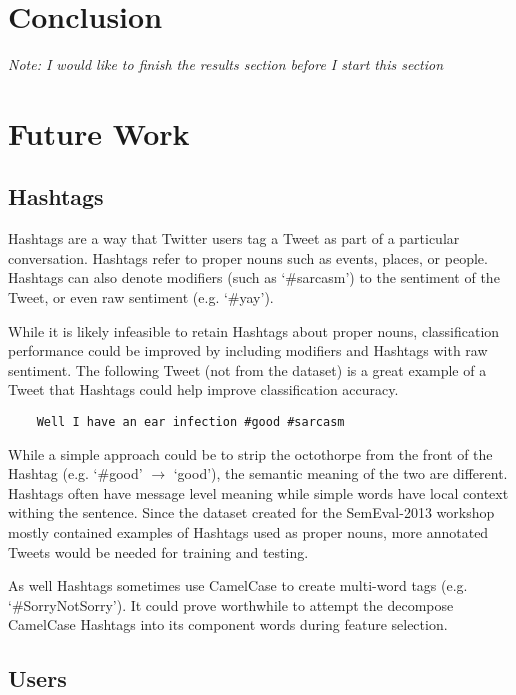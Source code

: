 \documentclass[final,3p,12pt]{elsarticle}
\begin{document}
\section{Conclusion}

\textit{Note: I would like to finish the results section before I start this section }


\section{Future Work}

\subsection{Hashtags}

Hashtags are a way that Twitter users tag a Tweet as part of a particular
conversation. Hashtags refer to proper nouns such as events, places, or people.
Hashtags can also denote modifiers (such as `\#sarcasm') to the sentiment of the
Tweet, or even raw sentiment (e.g. `\#yay').

While it is likely infeasible to retain Hashtags about proper nouns,
classification performance could be improved by including modifiers and
Hashtags with raw sentiment. The following Tweet (not from the dataset) is a
great example of a Tweet that Hashtags could help improve classification
accuracy.

\begin{verbatim}
    Well I have an ear infection #good #sarcasm
\end{verbatim}

While a simple approach could be to strip the octothorpe from the front of the
Hashtag (e.g. `\#good' $\rightarrow$ `good'), the semantic meaning of the two
are different. Hashtags often have message level meaning while simple words
have local context withing the sentence. Since the dataset created for the
SemEval-2013 workshop mostly contained examples of Hashtags used as proper
nouns, more annotated Tweets would be needed for training and testing.

As well Hashtags sometimes use CamelCase to create multi-word tags (e.g.
`\#SorryNotSorry'). It could prove worthwhile to attempt the decompose
CamelCase Hashtags into its component words during feature selection.

\subsection{Users}
\end{document}
